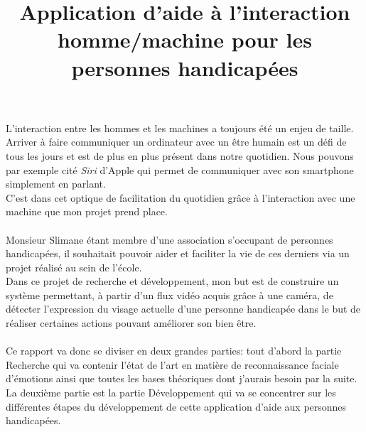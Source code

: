 \documentclass[overfullbox, poster]{polytech/polytech}
\title{Application d'aide à l'interaction homme/machine pour les personnes handicapées}
\begin{document}
\maketitle


L'interaction entre les hommes et les machines a toujours été un enjeu de taille. Arriver à faire communiquer un ordinateur avec un être humain est un défi de tous les jours et est de plus en plus présent dans notre quotidien. Nous pouvons par exemple cité \textit{Siri} d'Apple qui permet de communiquer avec son smartphone simplement en parlant.\\ 
C'est dans cet optique de facilitation du quotidien grâce à l'interaction avec une machine que mon projet prend place.\\
\\
Monsieur Slimane étant membre d'une association s'occupant de personnes handicapées, il souhaitait pouvoir aider et faciliter la vie de ces derniers via un projet réalisé au sein de l'école.\\
Dans ce projet de recherche et développement, mon but est de construire un système permettant, à partir d'un flux vidéo acquis grâce à une caméra, de détecter l'expression du visage actuelle d'une personne handicapée dans le but de réaliser certaines actions pouvant améliorer son bien être.\\
\\
Ce rapport va donc se diviser en deux grandes parties: tout d'abord la partie Recherche qui va contenir l'état de l'art en matière de reconnaissance faciale d'émotions ainsi que toutes les bases théoriques dont j'aurais besoin par la suite. La deuxième partie est la partie Développement qui va se concentrer sur les différentes étapes du développement de cette application d'aide aux personnes handicapées.\\
\end{document}
